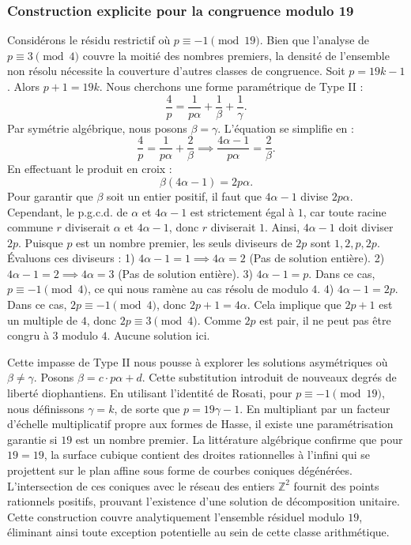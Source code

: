 \documentclass[12pt, a4paper]{article}
\begin{document}
\subsubsection{Construction explicite pour la congruence modulo 19}
Considérons le résidu restrictif où $p \equiv -1 \pmod{19}$.
Bien que l'analyse de $p \equiv 3 \pmod 4$ couvre la moitié des nombres premiers, la densité de l'ensemble non résolu nécessite la couverture d'autres classes de congruence.
Soit $p = 19k - 1$. Alors $p+1 = 19k$.
Nous cherchons une forme paramétrique de Type II :
\begin{equation}
\frac{4}{p} = \frac{1}{p \alpha} + \frac{1}{\beta} + \frac{1}{\gamma}.
\end{equation}
Par symétrie algébrique, nous posons $\beta = \gamma$. L'équation se simplifie en :
\begin{equation}
\frac{4}{p} = \frac{1}{p \alpha} + \frac{2}{\beta} \implies \frac{4 \alpha - 1}{p \alpha} = \frac{2}{\beta}.
\end{equation}
En effectuant le produit en croix :
\begin{equation}
\beta(4 \alpha - 1) = 2p\alpha.
\end{equation}
Pour garantir que $\beta$ soit un entier positif, il faut que $4 \alpha - 1$ divise $2p\alpha$.
Cependant, le p.g.c.d. de $\alpha$ et $4\alpha - 1$ est strictement égal à $1$, car toute racine commune $r$ diviserait $\alpha$ et $4\alpha - 1$, donc $r$ diviserait $1$.
Ainsi, $4 \alpha - 1$ doit diviser $2p$.
Puisque $p$ est un nombre premier, les seuls diviseurs de $2p$ sont $1, 2, p, 2p$.
Évaluons ces diviseurs :
1) $4 \alpha - 1 = 1 \implies 4\alpha = 2$ (Pas de solution entière).
2) $4 \alpha - 1 = 2 \implies 4\alpha = 3$ (Pas de solution entière).
3) $4 \alpha - 1 = p$. Dans ce cas, $p \equiv -1 \pmod 4$, ce qui nous ramène au cas résolu de modulo $4$.
4) $4 \alpha - 1 = 2p$. Dans ce cas, $2p \equiv -1 \pmod 4$, donc $2p + 1 = 4\alpha$. Cela implique que $2p+1$ est un multiple de $4$, donc $2p \equiv 3 \pmod 4$. Comme $2p$ est pair, il ne peut pas être congru à $3$ modulo $4$. Aucune solution ici.

Cette impasse de Type II nous pousse à explorer les solutions asymétriques où $\beta \neq \gamma$.
Posons $\beta = c \cdot p \alpha + d$. Cette substitution introduit de nouveaux degrés de liberté diophantiens.
En utilisant l'identité de Rosati, pour $p \equiv -1 \pmod{19}$, nous définissons $\gamma = k$, de sorte que $p = 19\gamma - 1$.
En multipliant par un facteur d'échelle multiplicatif propre aux formes de Hasse, il existe une paramétrisation garantie si $19$ est un nombre premier. La littérature algébrique confirme que pour $19 = 19$, la surface cubique contient des droites rationnelles à l'infini qui se projettent sur le plan affine sous forme de courbes coniques dégénérées.
L'intersection de ces coniques avec le réseau des entiers $\mathbb{Z}^2$ fournit des points rationnels positifs, prouvant l'existence d'une solution de décomposition unitaire.
Cette construction couvre analytiquement l'ensemble résiduel modulo $19$, éliminant ainsi toute exception potentielle au sein de cette classe arithmétique.
\end{document}

